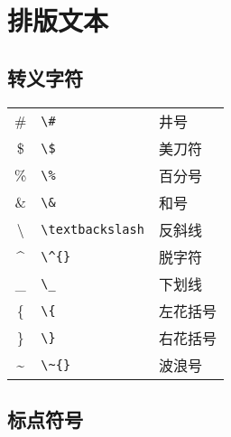 \tableofcontents


\newpage
\section{排版文本}


\subsection{转义字符}

\begin{table}[h!]
    \centering
    \begin{tabular}{c l l}
        \hline
        \#             & \verb|\#|             & 井号     \\
        \$             & \verb|\$|             & 美刀符   \\
        \%             & \verb|\%|             & 百分号   \\
        \&             & \verb|\&|             & 和号     \\
        \textbackslash & \verb|\textbackslash| & 反斜线   \\
        \^{}           & \verb|\^{}|           & 脱字符   \\
        \_             & \verb|\_|             & 下划线   \\
        \{             & \verb|\{|             & 左花括号 \\
        \}             & \verb|\}|             & 右花括号 \\
        \~{}           & \verb|\~{}|           & 波浪号   \\
        \hline
    \end{tabular}
\end{table}


\subsection{标点符号}

